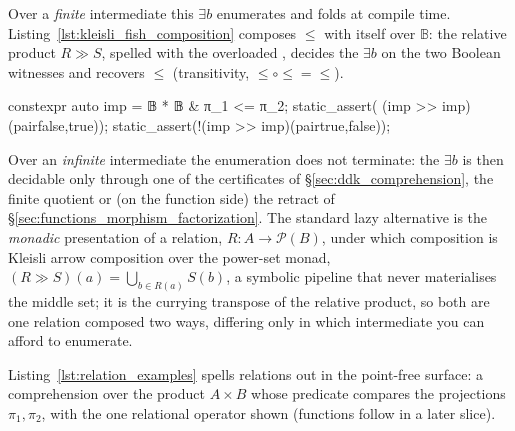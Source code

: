 \documentclass[11pt, a4paper]{article}
\begin{document}
Over a \emph{finite} intermediate this $\exists b$ enumerates and folds at compile time.
Listing~\ref{lst:kleisli_fish_composition} composes $\le$ with itself over $\mathbb{B}$: the relative product $R \gg S$, spelled with the overloaded \cppinline{>>}, decides the $\exists b$ on the two Boolean witnesses and recovers $\le$ (transitivity, $\le \circ \le = \le$).

\begin{listing}[htbp]
\caption{Composition of relations as the relative product $R \gg S = \{(a,c) \mid \exists b.\, R(a,b) \wedge S(b,c)\}$.  Over $\mathbb{B}$ the $\exists b$ enumerates the two Booleans and folds, so $\le \circ \le = \le$ (transitivity).}
\label{lst:kleisli_fish_composition}
\begin{cpp}
constexpr auto imp = 𝔹 * 𝔹 & π_1 <= π_2;
static_assert( (imp >> imp)(pair{false,true}));
static_assert(!(imp >> imp)(pair{true,false}));
\end{cpp}
\end{listing}

Over an \emph{infinite} intermediate the enumeration does not terminate: the $\exists b$ is then decidable only through one of the certificates of §\ref{sec:ddk_comprehension}, the finite quotient or (on the function side) the retract of §\ref{sec:functions_morphism_factorization}.
The standard lazy alternative is the \emph{monadic} presentation of a relation, $R : A \to \mathcal{P}(B)$, under which composition is Kleisli arrow composition over the power-set monad, $(R \mathbin{\gg} S)(a) = \bigcup_{b \in R(a)} S(b)$, a symbolic pipeline that never materialises the middle set; it is the currying transpose of the relative product, so both are one relation composed two ways, differing only in which intermediate you can afford to enumerate.

Listing~\ref{lst:relation_examples} spells relations out in the point-free surface: a comprehension over the product $A \times B$ whose predicate compares the projections $\pi_1, \pi_2$, with  the one relational operator shown (functions follow in a later slice).
\end{document}
